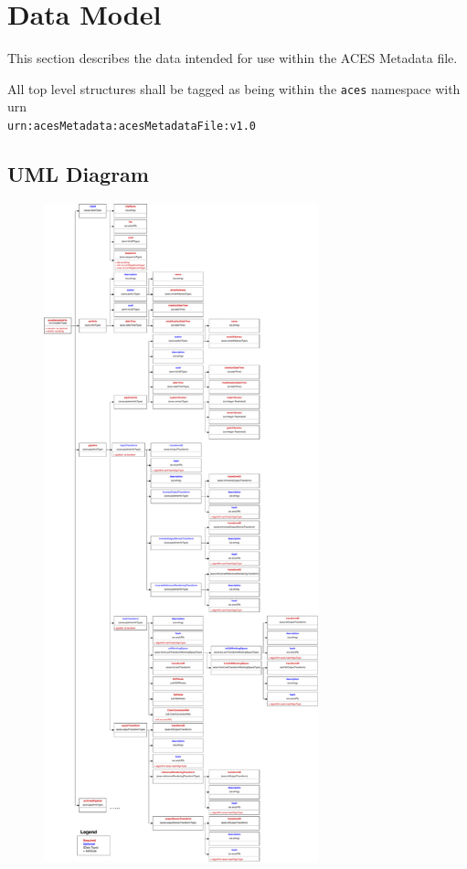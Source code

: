 \regularsectionformat	%

\newcommand{\xmlfield}[3]{
	\TabPositions{2em,1.75in,2.5in,2.6in}
	\tab\texttt{#1} \tab#2 \tab// #3	 \par
}

\chapter{Data Model}

This section describes the data intended for use within the ACES Metadata file.

All top level structures shall be tagged as being within the \texttt{aces} namespace with urn \\ \texttt{urn:acesMetadata:acesMetadataFile:v1.0}

\section{UML Diagram}
\begin{figure}[H]
  \centering
  \includegraphics[height=7.5in]{./images/amf_uml.pdf}
\end{figure}
\newpage

